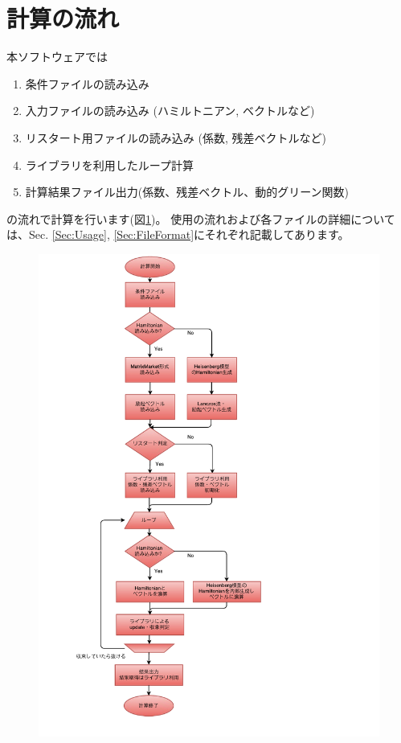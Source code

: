 \documentclass[12pt,titlepage]{jarticle}
\begin{document}
\newpage
\section{計算の流れ}
本ソフトウェアでは
\begin{enumerate}
\item{条件ファイルの読み込み}
\item{入力ファイルの読み込み (ハミルトニアン, ベクトルなど)}
\item{リスタート用ファイルの読み込み (係数, 残差ベクトルなど)}
\item{ライブラリを利用したループ計算}
\item{計算結果ファイル出力(係数、残差ベクトル、動的グリーン関数)}
\end{enumerate}
の流れで計算を行います(図\ref{Fig:CalcFlow})。
使用の流れおよび各ファイルの詳細については、Sec. \ref{Sec:Usage}, \ref{Sec:FileFormat}にそれぞれ記載してあります。

\begin{figure}[htbp]
\begin{center}
	\includegraphics[width=12cm]{flow.pdf}
	\label{Fig:CalcFlow}
\end{center}
\end{figure}
\end{document}
